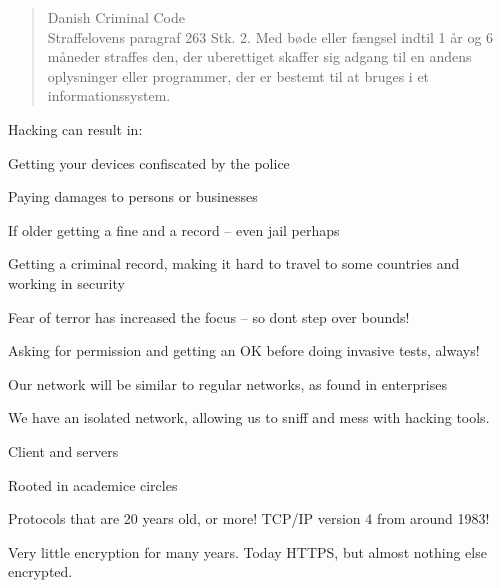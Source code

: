 \documentclass[Screen16to9,17pt]{foils}
\begin{document}

\begin{quote}\small
Danish Criminal Code\\
Straffelovens paragraf 263 Stk. 2. Med bøde eller fængsel indtil 1 år og 6 måneder straffes den, der uberettiget skaffer sig adgang til en andens oplysninger eller programmer, der er bestemt til at bruges i et informationssystem.
\end{quote}

Hacking can result in:
\begin{list2}
\item Getting your devices confiscated by the police
\item Paying damages to persons or businesses
\item If older getting a fine and a record -- even jail perhaps
\item Getting a criminal record, making it hard to travel to some countries and working in security
\item Fear of terror has increased the focus -- so dont step over bounds!
\end{list2}

Asking for permission and getting an OK before doing invasive tests, always!



\begin{list1}
\item Our network will be similar to regular networks, as found in enterprises
\item We have an isolated network, allowing us to sniff and mess with hacking tools.
\end{list1}






\begin{list1}
\item Client and servers
\item Rooted in academice circles
\item Protocols that are 20 years old, or more! TCP/IP version 4 from around 1983!
\item Very little encryption for many years. Today HTTPS, but almost nothing else encrypted.
\end{list1}
\end{document}
